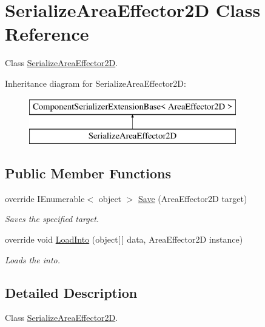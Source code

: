 \hypertarget{class_serialize_area_effector2_d}{}\section{Serialize\+Area\+Effector2D Class Reference}
\label{class_serialize_area_effector2_d}


Class \hyperlink{class_serialize_area_effector2_d}{Serialize\+Area\+Effector2D}.  


Inheritance diagram for Serialize\+Area\+Effector2D\+:\begin{figure}[H]
\begin{center}
\leavevmode
\includegraphics[height=2.000000cm]{class_serialize_area_effector2_d}
\end{center}
\end{figure}
\subsection*{Public Member Functions}
\begin{DoxyCompactItemize}
\item 
override I\+Enumerable$<$ object $>$ \hyperlink{class_serialize_area_effector2_d_a5d668a4b846f9371ddf87dc74d845d22}{Save} (Area\+Effector2D target)
\begin{DoxyCompactList}\small\item\em Saves the specified target. \end{DoxyCompactList}\item 
override void \hyperlink{class_serialize_area_effector2_d_ada592141d2f3deee413dc4b88389363d}{Load\+Into} (object\mbox{[}$\,$\mbox{]} data, Area\+Effector2D instance)
\begin{DoxyCompactList}\small\item\em Loads the into. \end{DoxyCompactList}\end{DoxyCompactItemize}


\subsection{Detailed Description}
Class \hyperlink{class_serialize_area_effector2_d}{Serialize\+Area\+Effector2D}. 



